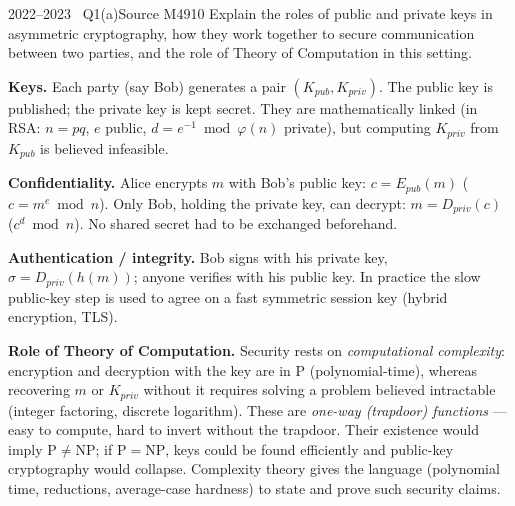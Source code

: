 \documentclass[11pt,a4paper]{article}
\begin{document}
\begin{question}{2022--2023 \textbullet\ Q1(a)}{Source M49}{10}
Explain the roles of public and private keys in asymmetric cryptography, how they work together to secure communication between two parties, and the role of Theory of Computation in this setting.
\end{question}
\begin{solution}
\textbf{Keys.} Each party (say Bob) generates a pair $(K_{pub},K_{priv})$. The public key is published; the private key is kept secret. They are mathematically linked (in RSA: $n=pq$, $e$ public, $d=e^{-1}\bmod\varphi(n)$ private), but computing $K_{priv}$ from $K_{pub}$ is believed infeasible.

\textbf{Confidentiality.} Alice encrypts $m$ with Bob's public key: $c=E_{pub}(m)$ ($c=m^e\bmod n$). Only Bob, holding the private key, can decrypt: $m=D_{priv}(c)$ ($c^d\bmod n$). No shared secret had to be exchanged beforehand.

\textbf{Authentication / integrity.} Bob signs with his private key, $\sigma=D_{priv}(h(m))$; anyone verifies with his public key. In practice the slow public-key step is used to agree on a fast symmetric session key (hybrid encryption, TLS).

\textbf{Role of Theory of Computation.} Security rests on \emph{computational complexity}: encryption and decryption with the key are in $\mathrm P$ (polynomial-time), whereas recovering $m$ or $K_{priv}$ without it requires solving a problem believed intractable (integer factoring, discrete logarithm). These are \emph{one-way (trapdoor) functions} --- easy to compute, hard to invert without the trapdoor. Their existence would imply $\mathrm P\neq\mathrm{NP}$; if $\mathrm P=\mathrm{NP}$, keys could be found efficiently and public-key cryptography would collapse. Complexity theory gives the language (polynomial time, reductions, average-case hardness) to state and prove such security claims.
\end{solution}
\end{document}
